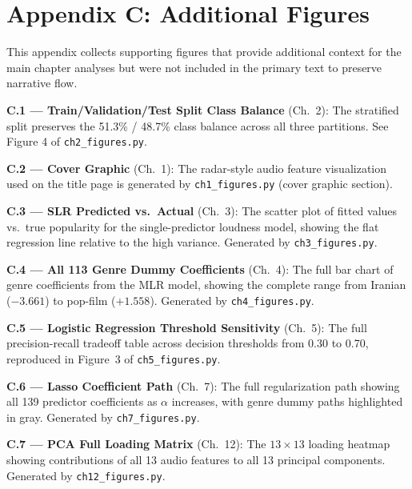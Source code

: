 \documentclass[12pt, oneside]{book}
\begin{document}
\chapter*{Appendix C: Additional Figures}
 
This appendix collects supporting figures that provide additional context for the main chapter analyses but were not included in the primary text to preserve narrative flow.
 
\textbf{C.1 --- Train/Validation/Test Split Class Balance} (Ch.\ 2): The stratified split preserves the 51.3\% / 48.7\% class balance across all three partitions. See Figure 4 of \texttt{ch2\_figures.py}.
 
\textbf{C.2 --- Cover Graphic} (Ch.\ 1): The radar-style audio feature visualization used on the title page is generated by \texttt{ch1\_figures.py} (cover graphic section).
 
\textbf{C.3 --- SLR Predicted vs.\ Actual} (Ch.\ 3): The scatter plot of fitted values vs.\ true popularity for the single-predictor loudness model, showing the flat regression line relative to the high variance. Generated by \texttt{ch3\_figures.py}.
 
\textbf{C.4 --- All 113 Genre Dummy Coefficients} (Ch.\ 4): The full bar chart of genre coefficients from the MLR model, showing the complete range from Iranian ($-3.661$) to pop-film ($+1.558$). Generated by \texttt{ch4\_figures.py}.
 
\textbf{C.5 --- Logistic Regression Threshold Sensitivity} (Ch.\ 5): The full precision-recall tradeoff table across decision thresholds from 0.30 to 0.70, reproduced in Figure~3 of \texttt{ch5\_figures.py}.
 
\textbf{C.6 --- Lasso Coefficient Path} (Ch.\ 7): The full regularization path showing all 139 predictor coefficients as $\alpha$ increases, with genre dummy paths highlighted in gray. Generated by \texttt{ch7\_figures.py}.
 
\textbf{C.7 --- PCA Full Loading Matrix} (Ch.\ 12): The $13 \times 13$ loading heatmap showing contributions of all 13 audio features to all 13 principal components. Generated by \texttt{ch12\_figures.py}.
 
\end{document}
